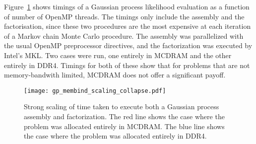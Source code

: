 Figure~\ref{fig:gp} shows timings of a Gaussian process likelihood evaluation
as a function of number of OpenMP threads.  The timings only include the
assembly and the factorisation, since these two procedures are the most
expensive at each iteration of a Markov chain Monte Carlo procedure.  The
assembly was parallelized with the usual OpenMP preprocessor directives, and
the factorization was executed by Intel's MKL.  Two cases were run, one
entirely in MCDRAM and the other entirely in DDR4.  Timings for both of these
show that for problems that are not memory-bandwith limited, MCDRAM does not
offer a significant payoff.

%
%
\begin{figure}
  \begin{center}
    \texttt{[image: gp\_membind\_scaling\_collapse.pdf]}
    \caption{Strong scaling of time taken to execute both a Gaussian process
    assembly and factorization.  The red line shows the case where the problem
    was allocated entirely in MCDRAM.  The blue line shows the case where the
    problem was allocated entirely in DDR4.}
    \label{fig:gp}
  \end{center}
\end{figure}
